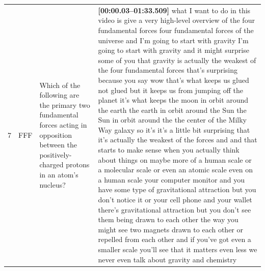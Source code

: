 \documentclass[10pt]{article}
\begin{document}
\begin{tiny}
\begin{longtable}{|r|p{0.375in}|p{1.275in}|p{3.5in}|}
7  &          FFF &                                                                                                                                  Which of the following are the primary two fundamental forces acting in opposition between the positively-charged protons in an atom's nucleus? &                                                                                                                                                                                                                                                                                                                                                                                                                                                                                                                                                                                                                                                                                                                                                                                                                                                                                                                                                                                                                                                                                                                                                                                                                                                                                                                                                                                                                                                                                                                                                                                                                                                                                                                                                              \textbf{[00:00.03--01:33.509]} what I want to do in this video is give a very high-level overview of the four fundamental forces four fundamental forces of the universe and I'm going to start with gravity I'm going to start with gravity and it might surprise some of you that gravity is actually the weakest of the four fundamental forces that's surprising because you say wow that's what keeps us glued not glued but it keeps us from jumping off the planet it's what keeps the moon in orbit around the earth the earth in orbit around the Sun the Sun in orbit around the the center of the Milky Way galaxy so it's it's a little bit surprising that it's actually the weakest of the forces and and that starts to make sense when you actually think about things on maybe more of a human scale or a molecular scale or even an atomic scale even on a human scale your computer monitor and you have some type of gravitational attraction but you don't notice it or your cell phone and your wallet there's gravitational attraction but you don't see them being drawn to each other the way you might see two magnets drawn to each other or repelled from each other and if you've got even a smaller scale you'll see that it matters even less we never even talk about gravity and chemistry 
\end{longtable}
\end{tiny}
\end{document}
